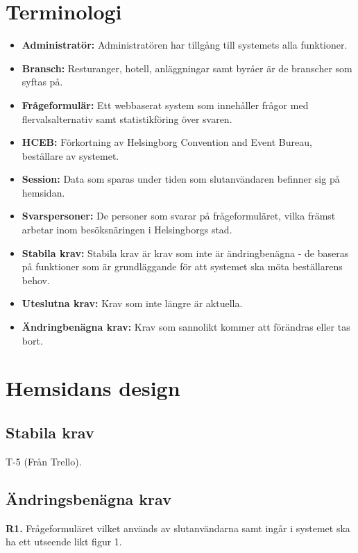 \documentclass{article}
\begin{document}
    \section{Terminologi}
    \begin{itemize}
        \item \textbf{Administratör:} Administratören har tillgång till systemets alla funktioner.
        \item \textbf{Bransch:} Resturanger, hotell, anläggningar samt byråer är de branscher som syftas på.
         \item \textbf{Frågeformulär:} Ett webbaserat system som innehåller frågor med flervalsalternativ samt statistikföring över svaren.
        \item \textbf{HCEB:} Förkortning av Helsingborg Convention and Event Bureau, beställare av systemet.
        \item \textbf{Session:} Data som sparas under tiden som slutanvändaren befinner sig på hemsidan.
        \item \textbf{Svarspersoner:}  De personer som svarar på frågeformuläret, vilka främst arbetar inom besöksnäringen i Helsingborgs stad. 
        \item\textbf{Stabila krav:}  Stabila krav är krav som inte är ändringbenägna - de baseras på funktioner som är grundläggande för att systemet ska möta beställarens behov.
         \item \textbf{Uteslutna krav:}  Krav som inte längre är aktuella.
        \item \textbf{Ändringbenägna krav:}  Krav som sannolikt kommer att förändras eller tas bort.
       
    \end{itemize}
    \newpage
    \section{Hemsidans design}
    
    \subsection{Stabila krav}
    
    T-5 (Från Trello).
     
    \subsection{Ändringsbenägna krav}
    
    \large{\textbf{R1.}}
    \normalsize{Frågeformuläret vilket används av slutanvändarna samt ingår i systemet ska ha ett utseende likt figur 1.}
    
\end{document}
